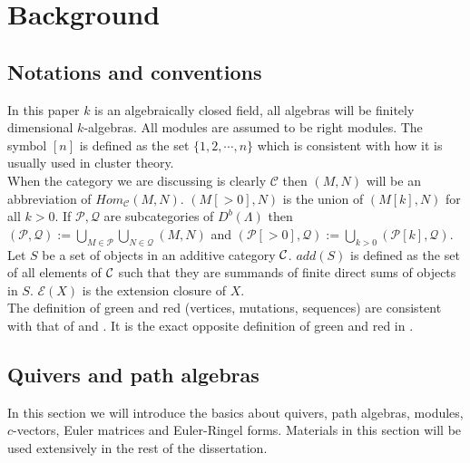 \chapter{Background}\label{CB}
\section{Notations and conventions}
\indent In this paper $k$ is an algebraically closed field, all algebras will be finitely dimensional $k$-algebras. All modules are assumed to be right modules. The symbol $[n]$ is defined as the set $\{1,2,\cdots, n\}$ which is consistent with how it is usually used in cluster theory.\\
\indent When the category we are discussing is clearly $\mathcal{C}$ then $(M,N)$ will be an abbreviation of $Hom_{\mathcal{C}}(M,N)$. $(M[>0],N)$ is the union of $(M[k],N)$ for all $k>0$. If $\mathcal{P}, \mathcal{Q}$ are subcategories of $D^b(\Lambda)$ then $(\mathcal{P}, \mathcal{Q}):=\bigcup\limits_{M\in\mathcal{P}}\bigcup\limits_{N\in\mathcal{Q}}(M,N)$ and $(\mathcal{P}[>0], \mathcal{Q}):=\bigcup\limits_{k>0}(\mathcal{P}[k], \mathcal{Q})$. Let $S$ be a set of objects in an additive category $\mathcal{C}$. $add(S)$ is defined as the set of all elements of $\mathcal{C}$ such that they are summands of finite direct sums of objects in $S$. $\mathcal{E}(X)$ is the extension closure of $X$.\\
\indent The definition of green and red (vertices, mutations, sequences) are consistent with that of \cite{Kel11} and \cite{BDP13}. It is the exact opposite definition of green and red in \cite{BHIT15}.\\
\section{Quivers and path algebras}
\indent In this section we will introduce the basics about quivers, path algebras, modules, $c$-vectors, Euler matrices and Euler-Ringel forms. Materials in this section will be used extensively in the rest of the dissertation.
